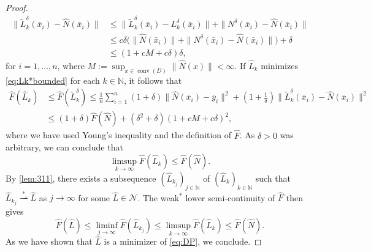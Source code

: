 \documentclass[10pt,a4paper]{amsart}
\newcommand{\N}{\mathcal{N}}
\newcommand{\conv}{\operatorname{conv}}
\newcommand{\weakk}{\stackrel{\ast}{\rightharpoonup}}
\begin{document}
\begin{proof}
$$
\begin{aligned}
\|\widetilde{L}_k^\delta(\bar x_i)-\widehat{N}(\bar x_i)\|&\leq \|\widetilde{L}_k^\delta(\bar x_i)- L_k^\delta(\bar x_i)\|+\|N^\delta(\bar x_i)-\widehat{N}(\bar x_i)\|\\
&\leq c\delta \bigl( \| \widehat{N}(\bar x_i) \| + \|N^\delta(\bar x_i) - \widehat{N}(\bar x_i) \| \bigr) + \delta\\
&\leq (1+c M+c\delta)\delta, 
\end{aligned}
$$
for $i=1,\ldots, n$, where $M:= \sup_{x \in \conv(D)} \| \widehat{N}(x) \| < \infty$. If $\widehat{L}_k$ minimizes \cref{eq:Lk*bounded} for each $k\in\mathbb{N}$, it follows that
\begin{align*}
\widehat{F}(\widehat{L}_k)&\leq \widehat{F}(\widetilde{L}_k^\delta)\leq \frac1n\sum_{i=1}^n(1+\delta)\|\widehat{N}(\bar x_i)-\bar y_i\|^2+\left(1+\frac1\delta\right)\|\widetilde{L}_k^\delta(\bar x_i)-\widehat{N}(\bar x_i)\|^2\\
&\leq (1+\delta)\widehat{F}(\widehat{N})+\left(\delta^2+\delta\right)(1+c M+c\delta)^2,
\end{align*}
where we have used Young's inequality and the definition of $\widehat{F}$. As $\delta>0$ was arbitrary, we can conclude that
$$
\limsup_{k\to\infty} \widehat{F}(\widehat{L}_k)\leq \widehat{F}(\widehat{N}).
$$
By \cref{lem:311}, there exists a subsequence  $(\widehat{L}_{k_j})_{j\in\mathbb{N}}$ of $(\widehat{L}_k)_{k\in\mathbb{N}}$ such that $\widehat{L}_{k_j}\weakk \widehat{L}$ as $j\to\infty$ for some $\widehat{L} \in \N$. The weak$^*$ lower semi-continuity of $\widehat{F}$ then gives
$$
\widehat{F}(\widehat{L})\leq \liminf_{j\to\infty}\widehat{F}(\widehat{L}_{k_j})\leq \limsup_{k\to\infty}\widehat{F}(\widehat{L}_k)\leq \widehat{F}(\widehat{N}).
$$
As we have shown that $\widehat{L}$ is a minimizer of \cref{eq:DP}, we conclude.
\end{proof}
\end{document}

